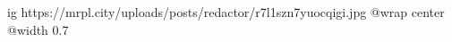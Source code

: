  
 
 
 
 

\ifcmt
  ig https://mrpl.city/uploads/posts/redactor/r7l1szn7yuocqigi.jpg
  @wrap center
  @width 0.7
\fi
